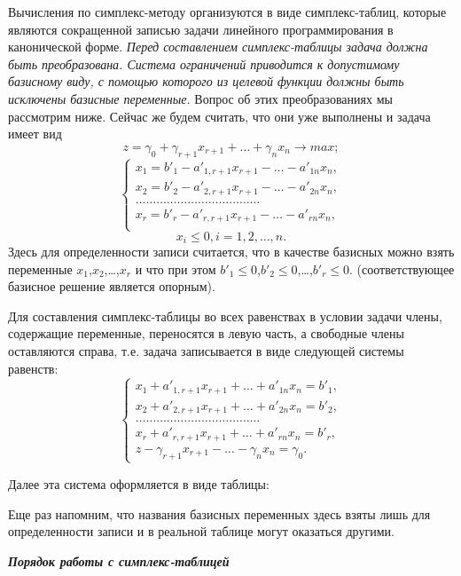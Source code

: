 \documentclass{article}
\begin{document}
Вычисления по симплекс-методу организуются в виде симплекс-таблиц, которые являются сокращенной записью задачи линейного программирования в канонической форме. \textit{Перед составлением симплекс-таблицы задача должна быть преобразована. Система ограничений приводится к допустимому базисному виду, с помощью которого из целевой функции должны быть исключены базисные  переменные.} Вопрос об этих преобразованиях мы рассмотрим ниже. Сейчас же будем считать, что они уже выполнены и задача имеет вид
$$ z = \gamma_0 + \gamma_{r+1}x_{r+1} + \dots  + \gamma_nx_n \rightarrow max;$$ 
\begin{equation*}
\begin{cases}
x_1 = b'_1 - a'_{1,r+1}x_{r+1} - \dots - a'_{1n}x_n,\\
x_2 = b'_2 - a'_{2,r+1}x_{r+1} - \dots - a'_{2n}x_n,\\
\dots\dots\dots\dots\dots\dots\dots\dots\dots\dots\dots\dots\\
x_r = b'_r - a'_{r,r+1}x_{r+1} - \dots - a'_{rn}x_n,\\
\end{cases}
\end{equation*}
$$ x_i \leq 0, i = 1, 2, \dots , n.$$
Здесь для определенности записи считается, что в качестве базисных можно взять переменные $x_1$,$x_2$,\dots,$x_r$ и что при этом $b'_1 \leq 0$,$b'_2 \leq 0$,\dots,$b'_r \leq 0$. (соответствующее  базисное решение является опорным).

Для составления симплекс-таблицы во всех равенствах в условии  задачи члены, содержащие переменные, переносятся в левую часть, а свободные члены оставляются справа, т.е. задача записывается в виде следующей системы равенств:
\begin{equation*}
\begin{cases}
x_1 +  a'_{1,r+1}x_{r+1} + \dots + a'_{1n}x_n = b'_1,\\
x_2 +  a'_{2,r+1}x_{r+1} + \dots + a'_{2n}x_n = b'_2,\\
\dots\dots\dots\dots\dots\dots\dots\dots\dots\dots\dots\dots\\
x_r +  a'_{r,r+1}x_{r+1} + \dots + a'_{rn}x_n = b'_r,\\
z - \gamma_{r+1} x_{r+1} - \dots - \gamma_nx_n = \gamma_0.
\end{cases}
\end{equation*}

Далее эта система оформляется  в виде таблицы:

Еще раз напомним, что названия базисных переменных здесь взяты лишь для определенности записи и в реальной таблице могут оказаться другими.
\begin{center}
\textit{\textbf{Порядок работы с симплекс-таблицей}}
\end{center}
\end{document}
